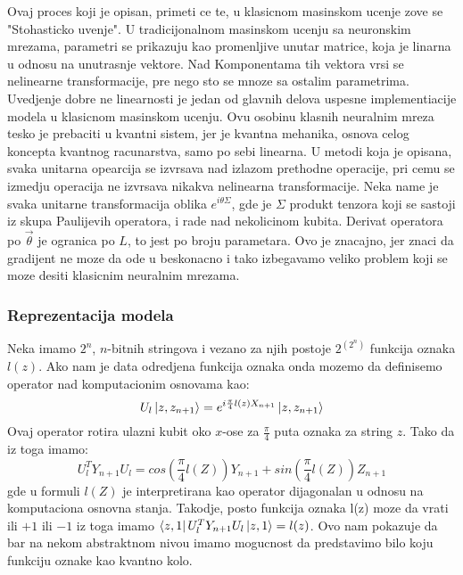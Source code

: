 \documentclass[12pt, letterpaper, oneside]{article}
\begin{document}
Ovaj proces koji je opisan, primeti ce te, u klasicnom masinskom ucenje zove se "Stohasticko uvenje".
U tradicijonalnom masinskom ucenju sa neuronskim mrezama, parametri se prikazuju kao promenljive unutar matrice, koja 
je linarna u odnosu na unutrasnje vektore. Nad Komponentama tih vektora vrsi se nelinearne transformacije, pre nego sto se mnoze sa
ostalim parametrima. Uvedjenje dobre ne linearnosti je jedan od glavnih delova uspesne implementiacije modela u klasicnom masinskom ucenju.
Ovu osobinu klasnih neuralnim mreza tesko je prebaciti u kvantni sistem, jer je kvantna mehanika, osnova celog koncepta kvantnog racunarstva, samo po sebi linearna.
U metodi koja je opisana, svaka unitarna opearcija se izvrsava nad izlazom prethodne operacije, pri cemu se izmedju operacija ne izvrsava nikakva nelinearna transformacije.
Neka name je svaka unitarne transformacija oblika $e^{i\theta\Sigma}$, gde je $\Sigma$ produkt tenzora koji se sastoji iz skupa Paulijevih operatora, i rade nad nekolicinom kubita.
Derivat operatora po $\overrightarrow{\theta}$ je ogranica po $L$, to jest po broju parametara.
Ovo je znacajno, jer znaci da gradijent ne moze da ode u beskonacno i tako izbegavamo veliko problem koji se moze desiti klasicnim neuralnim mrezama.

\subsubsection{Reprezentacija modela}
Neka imamo $2^n$, $n$-bitnih stringova i vezano za njih postoje $2^{(2^n)}$ funkcija oznaka $l(z)$.
Ako nam je data odredjena funkcija oznaka onda mozemo da definisemo operator nad komputacionim osnovama kao:
\[
    U_l\Ket{z,z_{n+1}} = e^{i\frac{\pi}{4}l(z)X_{n+1}}\Ket{z,z_{n+1}}
\]
Ovaj operator rotira ulazni kubit oko $x$-ose za $\frac{\pi}{4}$ puta oznaka za string $z$.
Tako da iz toga imamo:
\[
    U_l^TY_{n+1}U_l = cos(\frac{\pi}{4}l(Z))Y_{n+1} + sin(\frac{\pi}{4}l(Z))Z_{n+1}
\]
gde u formuli $l(Z)$ je interpretirana kao operator dijagonalan u odnosu na komputaciona osnovna stanja.
Takodje, posto funkcija oznaka l(z) moze da vrati ili $+1$ ili $-1$ iz toga imamo $\bra{z,1}U_l^TY_{n+1}U_l\ket{z,1} = l(z)$.
Ovo nam pokazuje da bar na nekom abstraktnom nivou imamo mogucnost da predstavimo bilo koju funkciju oznake kao kvantno kolo.
\end{document}
